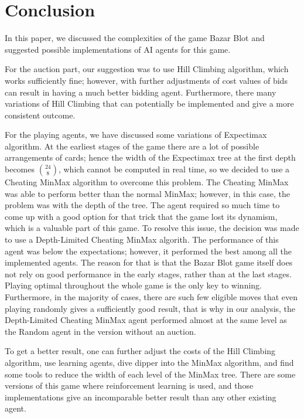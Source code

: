 \section{Conclusion}\label{Conclusion}\thispagestyle{SectionFirstPage} %
\hspace{\parindent} In this paper,
we discussed the complexities of the game Bazar Blot
and suggested possible implementations of AI agents for this game.

\hspace{\parindent} For the auction part, our suggestion was to use Hill Climbing algorithm, which works sufficiently fine; however, with further adjustments of cost values of bids can result in having a much better bidding agent.
Furthermore, there many variations of Hill Climbing that can potentially be implemented and give a more consistent outcome.

\hspace{\parindent} For the playing agents, we have discussed some variations of Expectimax algorithm.
At the earliest stages of the game there are a lot of possible arrangements of cards; hence the width of the Expectimax tree at the first depth becomes $\binom{24}{8}$, which cannot be computed in real time, so we decided to use a Cheating MinMax algorithm to overcome this problem.
The Cheating MinMax was able to perform better than the normal MinMax; however, in this case, the problem was with the depth of the tree.
The agent required so much time to come up with a good option for that trick that the game lost its dynamism, which is a valuable part of this game.
To resolve this issue, the decision was made to use a Depth-Limited Cheating MinMax algorith.
The performance of this agent was below the expectations; however, it performed the best among all the implemented agents.
The reason for that is that the Bazar Blot game itself does not rely on good performance in the early stages, rather than at the last stages.
Playing optimal throughout the whole game is the only key to winning.
Furthermore, in the majority of cases, there are such few eligible moves that even playing randomly gives a sufficiently good result, that is why in our analysis, the Depth-Limited Cheating MinMax agent performed almost at the same level as the Random agent in the version without an auction.

\hspace{\parindent} To get a better result, one can further adjust the costs of the Hill Climbing algorithm, use learning agents, dive dipper into the MinMax algorithm, and find some tools to reduce the width of each level of the MinMax tree.
There are some versions of this game where reinforcement learning is used, and those implementations give an incomparable better result than any other existing agent.